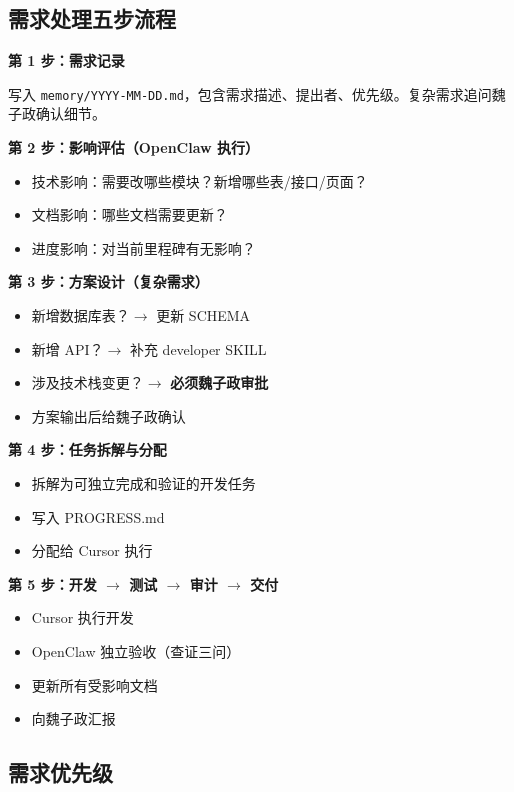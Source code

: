 \documentclass[11pt,a4paper]{article}
\begin{document}
\subsection{需求处理五步流程}

\textbf{第 1 步：需求记录}

写入 \texttt{memory/YYYY-MM-DD.md}，包含需求描述、提出者、优先级。复杂需求追问魏子政确认细节。

\textbf{第 2 步：影响评估（OpenClaw 执行）}

\begin{itemize}[nosep]
  \item 技术影响：需要改哪些模块？新增哪些表/接口/页面？
  \item 文档影响：哪些文档需要更新？
  \item 进度影响：对当前里程碑有无影响？
\end{itemize}

\textbf{第 3 步：方案设计（复杂需求）}

\begin{itemize}[nosep]
  \item 新增数据库表？$\to$ 更新 SCHEMA
  \item 新增 API？$\to$ 补充 developer SKILL
  \item 涉及技术栈变更？$\to$ \textbf{必须魏子政审批}
  \item 方案输出后给魏子政确认
\end{itemize}

\textbf{第 4 步：任务拆解与分配}

\begin{itemize}[nosep]
  \item 拆解为可独立完成和验证的开发任务
  \item 写入 PROGRESS.md
  \item 分配给 Cursor 执行
\end{itemize}

\textbf{第 5 步：开发 $\to$ 测试 $\to$ 审计 $\to$ 交付}

\begin{itemize}[nosep]
  \item Cursor 执行开发
  \item OpenClaw 独立验收（查证三问）
  \item 更新所有受影响文档
  \item 向魏子政汇报
\end{itemize}

\subsection{需求优先级}
\end{document}
